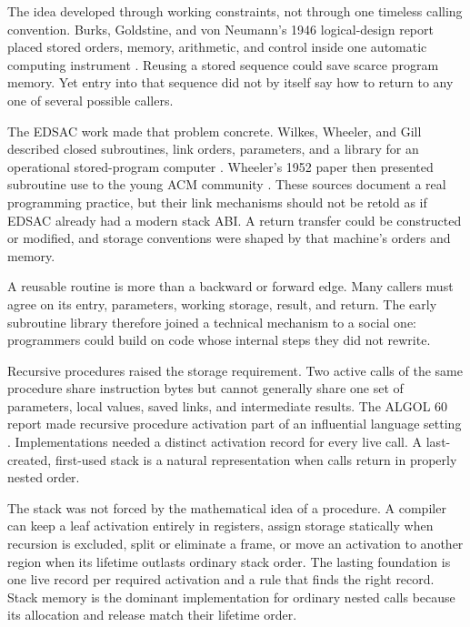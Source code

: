 The idea developed through working constraints, not through one timeless
calling convention. Burks, Goldstine, and von Neumann's 1946 logical-design
report placed stored orders, memory, arithmetic, and control inside one
automatic computing instrument \autocite{burks1946logical}. Reusing a stored
sequence could save scarce program memory. Yet entry into that sequence did not
by itself say how to return to any one of several possible callers.

The EDSAC work made that problem concrete. Wilkes, Wheeler, and Gill described
closed subroutines, link orders, parameters, and a library for an operational
stored-program computer \autocite{wilkes1951preparation}. Wheeler's 1952 paper
then presented subroutine use to the young ACM community
\autocite{wheeler1952subroutines}. These sources document a real programming
practice, but their link mechanisms should not be retold as if EDSAC already
had a modern stack ABI. A return transfer could be constructed or modified,
and storage conventions were shaped by that machine's orders and memory.

\begin{archive}[title={A library turned control transfer into cooperation}]
A reusable routine is more than a backward or forward edge. Many callers must
agree on its entry, parameters, working storage, result, and return. The early
subroutine library therefore joined a technical mechanism to a social one:
programmers could build on code whose internal steps they did not rewrite.
\end{archive}

Recursive procedures raised the storage requirement. Two active calls of the
same procedure share instruction bytes but cannot generally share one set of
parameters, local values, saved links, and intermediate results. The ALGOL 60
report made recursive procedure activation part of an influential language
setting \autocite{naur1963algol}. Implementations needed a distinct activation
record for every live call. A last-created, first-used stack is a natural
representation when calls return in properly nested order.

The stack was not forced by the mathematical idea of a procedure. A compiler
can keep a leaf activation entirely in registers, assign storage statically
when recursion is excluded, split or eliminate a frame, or move an activation
to another region when its lifetime outlasts ordinary stack order. The lasting
foundation is one live record per required activation and a rule that finds the
right record. Stack memory is the dominant implementation for ordinary nested
calls because its allocation and release match their lifetime order.

